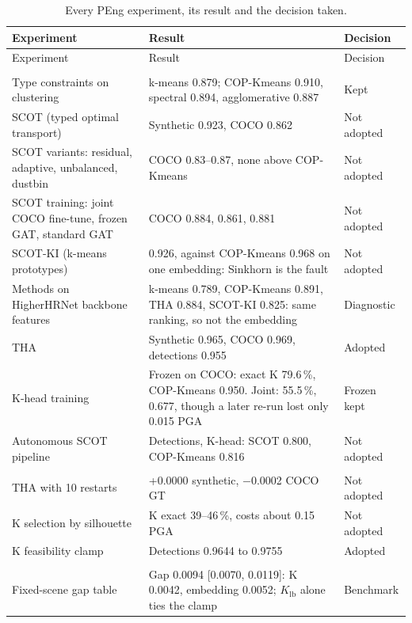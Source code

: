\documentclass[11pt,a4paper]{article}
\newcommand{\Klb}{K_{\mathrm{lb}}}
\begin{document}
\begin{xltabular}{\linewidth}{@{}P{4.2cm}LP{2.15cm}@{}}
\caption{Every PEng experiment, its result and the decision taken.}
\label{tab:experiments} \\
\toprule
Experiment & Result & Decision \\
\midrule
\endfirsthead
\toprule
Experiment & Result & Decision \\
\midrule
\endhead
\bottomrule
\endlastfoot
{} \\
Type constraints on clustering & k-means 0.879; COP-Kmeans 0.910, spectral 0.894, agglomerative 0.887 & Kept \\
SCOT (typed optimal transport) & Synthetic 0.923, COCO 0.862 & Not adopted \\
SCOT variants: residual, adaptive, unbalanced, dustbin & COCO 0.83--0.87, none above COP-Kmeans & Not adopted \\
SCOT training: joint COCO fine-tune, frozen GAT, standard GAT & COCO 0.884, 0.861, 0.881 & Not adopted \\
SCOT-KI (k-means prototypes) & 0.926, against COP-Kmeans 0.968 on one embedding: Sinkhorn is the fault & Not adopted \\
Methods on HigherHRNet backbone features & k-means 0.789, COP-Kmeans 0.891, THA 0.884, SCOT-KI 0.825: same ranking, so not the embedding & Diagnostic \\
THA & Synthetic 0.965, COCO 0.969, detections 0.955 & Adopted \\
K-head training & Frozen on COCO: exact K 79.6\,\%, COP-Kmeans 0.950. Joint: 55.5\,\%, 0.677, though a later re-run lost only 0.015 PGA & Frozen kept \\
Autonomous SCOT pipeline & Detections, K-head: SCOT 0.800, COP-Kmeans 0.816 & Not adopted \\
\addlinespace
{} \\
THA with 10 restarts & +0.0000 synthetic, $-$0.0002 COCO GT & Not adopted \\
K selection by silhouette & K exact 39--46\,\%, costs about 0.15 PGA & Not adopted \\
K feasibility clamp & Detections 0.9644 to 0.9755 & Adopted \\
\addlinespace
{} \\
Fixed-scene gap table & Gap 0.0094 [0.0070, 0.0119]: K 0.0042, embedding 0.0052; $\Klb$ alone ties the clamp & Benchmark \\

\end{xltabular}
\end{document}
